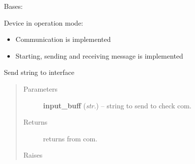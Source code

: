 \documentclass[letterpaper,10pt,english]{sphinxmanual}
\begin{document}
\begin{fulllineitems}

\begin{fulllineitems}
\label{enuActor.Devices:enuActor.Devices.Device.DualModeDevice.start_ttl}
\end{fulllineitems}


\end{fulllineitems}


\begin{fulllineitems}
\label{enuActor.Devices:enuActor.Devices.Device.OperationDevice}
Bases: {\hyperref[enuActor.Devices:enuActor.Devices.Device.Device]{}}

Device in operation mode:
\begin{itemize}
\item {} 
Communication is implemented

\item {} 
Starting, sending and receiving message is implemented

\end{itemize}

\begin{fulllineitems}
\label{enuActor.Devices:enuActor.Devices.Device.OperationDevice.op_send}
Send string to interface
\begin{quote}\begin{description}
\item[{Parameters}] \leavevmode
\textbf{input\_buff} (\emph{str.}) -- string to send to check com.

\item[{Returns}] \leavevmode
returns from com.

\item[{Raises}] \leavevmode
{\hyperref[enuActor.Devices:enuActor.Devices.Error.CommErr]{}}

\end{description}\end{quote}


\end{fulllineitems}
\end{fulllineitems}
\end{document}

